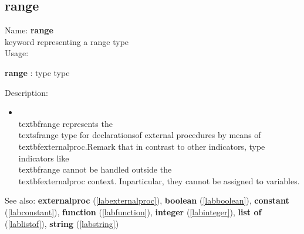 \subsection{range}
\label{labrange}
\noindent Name: \textbf{range}\\
keyword representing a \textsf{range} type \\
\noindent Usage: 
\begin{center}
\textbf{range} : \textsf{type type}\\
\end{center}
\noindent Description: \begin{itemize}

\item \\textbf{range} represents the \\textsf{range} type for declarations\n   of external procedures by means of \\textbf{externalproc}.\n    \n   Remark that in contrast to other indicators, type indicators like\n   \\textbf{range} cannot be handled outside the \\textbf{externalproc} context.  In\n   particular, they cannot be assigned to variables.\n\end{itemize}
See also: \textbf{externalproc} (\ref{labexternalproc}), \textbf{boolean} (\ref{labboolean}), \textbf{constant} (\ref{labconstant}), \textbf{function} (\ref{labfunction}), \textbf{integer} (\ref{labinteger}), \textbf{list of} (\ref{lablistof}), \textbf{string} (\ref{labstring})
